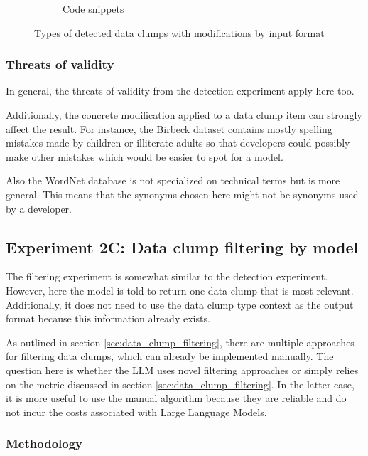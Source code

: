 \begin{figure}[ht!]
\begin{subfigure}[t]{0.44\columnwidth}
        \caption{Code snippets}
       \label{fig:detectSyn_snippets}
    \end{subfigure}
       

    \caption{Types of detected data clumps with modifications by input format}
    
    \label{fig:detect_syn_input_type}
\end{figure}

\subsubsection{Threats of validity}
In general, the threats of validity from the detection experiment apply here too. 

Additionally, the concrete modification applied to a data clump item can strongly affect the result. For instance, the Birbeck dataset contains mostly spelling mistakes made by children or illiterate adults so that developers could possibly make other mistakes which would be easier to spot for a model. 

Also the WordNet database is not specialized on technical terms but is more general. This means that the synonyms chosen here might not be synonyms used by a developer.

\subsection{Experiment 2C: Data clump filtering by model}

The filtering experiment is somewhat similar to the detection experiment. However, here the model is told to return one data clump that is most relevant. Additionally, it does not need to use the data clump type context as the output format because this information already exists. 

As outlined in section \ref{sec:data_clump_filtering}, there are multiple approaches for filtering data clumps, which can already be implemented manually. 
The question here is whether the \ac{LLM} uses novel filtering approaches or simply relies on the metric discussed in section \ref{sec:data_clump_filtering}. In the latter case, it is more useful to use the manual algorithm because they are reliable and do not incur the costs associated with Large Language Models. 

\subsubsection{Methodology}

